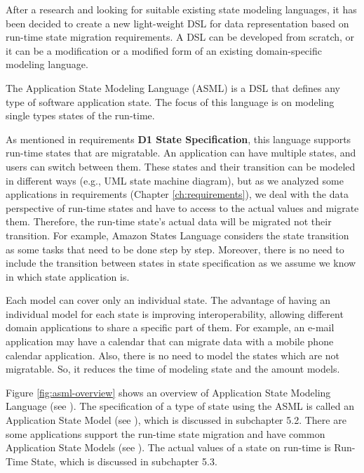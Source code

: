 After a research and looking for suitable existing state modeling languages, it has been decided to create a new light-weight DSL for data representation based on run-time state migration requirements.
A DSL can be developed from scratch, or it can be a modification or a modified form of an existing domain-specific modeling language.

The Application State Modeling Language (ASML) is a DSL that defines any type of software application state.
The focus of this language is on modeling single types states of the run-time.

As mentioned in requirements \textbf{D1 State Specification}, this language supports run-time states that are migratable.
An application can have multiple states, and users can switch between them.
These states and their transition can be modeled in different ways (e.g., UML state machine diagram), but as we analyzed some applications in requirements (Chapter \ref{ch:requirements}), we deal with the data perspective of run-time states and have to access to the actual values and migrate them. Therefore, the run-time state’s actual data will be migrated not their transition. For example, Amazon States Language considers the state transition as some tasks that need to be done step by step.
Moreover, there is no need to include the transition between states in state specification as we assume we know in which state application is. 

Each model can cover only an individual state. The advantage of having an individual model for each state is improving interoperability, allowing different domain applications to share a specific part of them.
For example, an e-mail application may have a calendar that can migrate data with a mobile phone calendar application.
Also, there is no need to model the states which are not migratable. So, it reduces the time of modeling state and the amount models. 

Figure \ref{fig:asml-overview} shows an overview of Application State Modeling Language (see \fcircone). The specification of a type of state using the ASML is called an Application State Model (see \fcirctwo), which is discussed in subchapter 5.2. There are some applications support the run-time state migration and have common Application State Models (see \fcircthree). The  actual values of a state on run-time is Run-Time State, which is discussed in subchapter 5.3.

